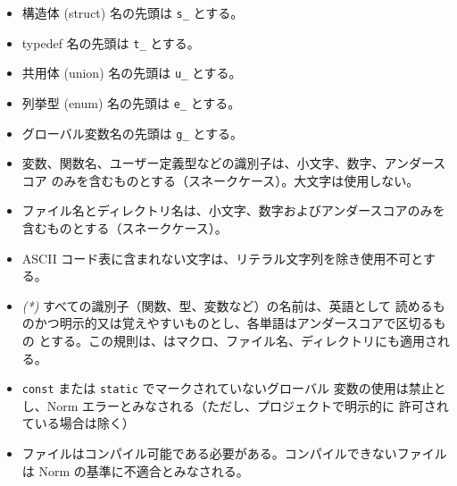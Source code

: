 \documentclass{42-ja}
\begin{document}
        \begin{itemize}

            \item 構造体 (struct) 名の先頭は \texttt{s\_} とする。

            \item typedef 名の先頭は \texttt{t\_} とする。

            \item 共用体 (union) 名の先頭は \texttt{u\_} とする。

            \item 列挙型 (enum) 名の先頭は \texttt{e\_} とする。

            \item グローバル変数名の先頭は \texttt{g\_} とする。

            \item 変数、関数名、ユーザー定義型などの識別子は、小文字、数字、アンダースコア
              のみを含むものとする（スネークケース）。大文字は使用しない。

            \item ファイル名とディレクトリ名は、小文字、数字およびアンダースコアのみを
              含むものとする（スネークケース）。

            \item ASCII コード表に含まれない文字は、リテラル文字列を除き使用不可とする。

            \item \textit{(*)} すべての識別子（関数、型、変数など）の名前は、英語として
              読めるものかつ明示的又は覚えやすいものとし、各単語はアンダースコアで区切るもの
              とする。この規則は、はマクロ、ファイル名、ディレクトリにも適用される。

            \item \texttt{const} または \texttt{static} でマークされていないグローバル
              変数の使用は禁止とし、Norm エラーとみなされる（ただし、プロジェクトで明示的に
              許可されている場合は除く）

            \item ファイルはコンパイル可能である必要がある。コンパイルできないファイルは
              Norm の基準に不適合とみなされる。

        \end{itemize}
\newpage

\end{document}
